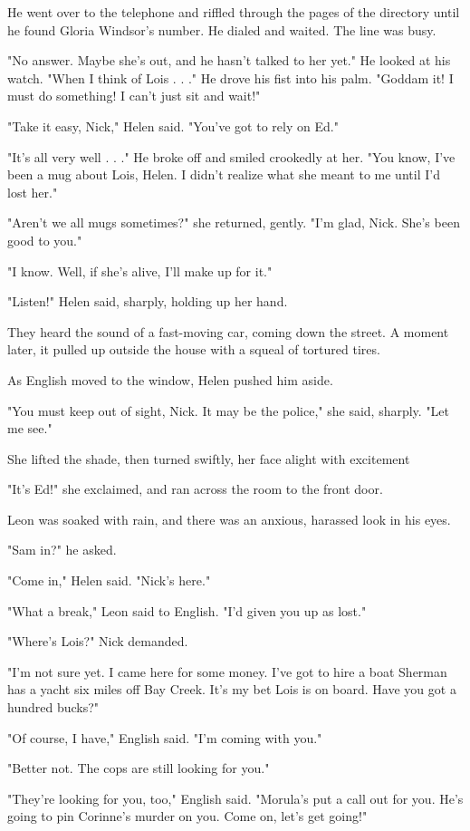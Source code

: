 \documentclass{novel}
\begin{document}
He went over to the telephone and riffled through the pages of the directory until he found Gloria Windsor's number. He dialed and waited. The line was busy.

"No answer. Maybe she's out, and he hasn't talked to her yet." He looked at his watch. "When I think of Lois . . ." He drove his fist into his palm. "Goddam it! I must do something! I can't just sit and wait!"

"Take it easy, Nick," Helen said. "You've got to rely on Ed."

"It's all very well . . ." He broke off and smiled crookedly at her. "You know, I've been a mug about Lois, Helen. I didn't realize what she meant to me until I'd lost her."

"Aren't we all mugs sometimes?" she returned, gently. "I'm glad, Nick. She's been good to you."

"I know. Well, if she's alive, I'll make up for it."

"Listen!" Helen said, sharply, holding up her hand.

They heard the sound of a fast-moving car, coming down the street. A moment later, it pulled up outside the house with a squeal of tortured tires.

As English moved to the window, Helen pushed him aside.

"You must keep out of sight, Nick. It may be the police," she said, sharply. "Let me see."

She lifted the shade, then turned swiftly, her face alight with excitement

"It's Ed!" she exclaimed, and ran across the room to the front door.

Leon was soaked with rain, and there was an anxious, harassed look in his eyes.

"Sam in?" he asked.

"Come in," Helen said. "Nick's here."

"What a break," Leon said to English. "I'd given you up as lost."

"Where's Lois?" Nick demanded.

"I'm not sure yet. I came here for some money. I've got to hire a boat Sherman has a yacht six miles off Bay Creek. It's my bet Lois is on board. Have you got a hundred bucks?"

"Of course, I have," English said. "I'm coming with you."

"Better not. The cops are still looking for you."

"They're looking for you, too," English said. "Morula's put a call out for you. He's going to pin Corinne's murder on you. Come on, let's get going!"
\end{document}
